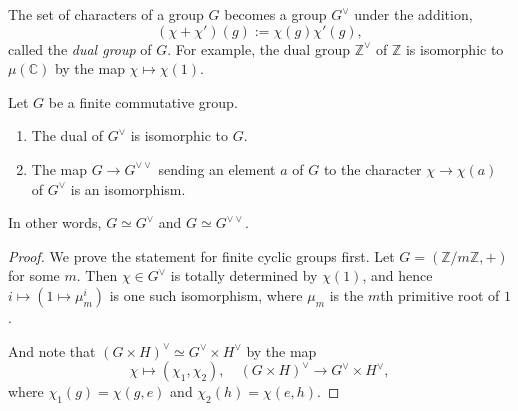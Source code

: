 \begin{definition}
  The set of characters of a group \( G \) becomes a group \( G^\vee \) under
  the addition,
  \[
    (\chi + \chi')(g) := \chi(g) \chi'(g),
  \]
  called the \emph{dual group} of \( G \). For example, the dual group \(
  \mathbb{Z}^\vee \) of \( \mathbb{Z} \) is isomorphic to \( \mu(\mathbb{C}) \)
  by the map \( \chi \mapsto \chi(1) \).
\end{definition}

\begin{theorem}
  Let \( G \) be a finite commutative group.
  \begin{enumerate}
    \item The dual of \( G^\vee \) is isomorphic to \( G \).
    \item The map \( G \to G^{\vee\vee} \) sending an element \( a \) of \( G \)
      to the character \( \chi \to \chi(a) \) of \( G^{\vee} \) is an
      isomorphism.
  \end{enumerate}
  In other words, \( G \simeq G^\vee \) and \( G \simeq G^{\vee\vee} \).
\end{theorem}
\begin{proof}
  We prove the statement for finite cyclic groups first. Let \( G = (\mathbb{Z}
  / m \mathbb{Z}, +) \) for some \( m \). Then \( \chi \in G^{\vee} \) is
  totally determined by \( \chi(1) \), and hence \( i \mapsto (1 \mapsto
  \mu_m^i) \) is one such isomorphism, where \( \mu_m \) is the \( m \)th
  primitive root of \( 1 \).

  And note that \( (G \times H)^{\vee} \simeq G^{\vee} \times H^{\vee} \) by the map
  \[
    \chi \mapsto (\chi_1, \chi_2),\quad (G \times H)^{\vee} \to G^\vee \times H^\vee,
  \]
  where \( \chi_1(g) = \chi(g, e) \) and \( \chi_2(h) = \chi(e, h) \).
\end{proof}

